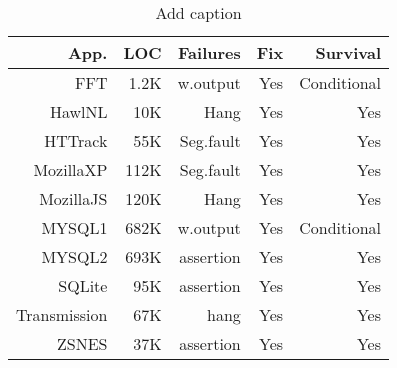 \begin{table}[htbp]
  \centering
  \caption{Add caption}
    \begin{tabular}{rrrrr}
    \toprule
    App. & LOC & Failures & Fix & Survival \\
    \midrule
    FFT & 1.2K & w.output & Yes & Conditional \\
    HawlNL & 10K & Hang & Yes & Yes \\
    HTTrack & 55K & Seg.fault & Yes & Yes \\
    MozillaXP & 112K & Seg.fault & Yes & Yes \\
    MozillaJS & 120K & Hang & Yes & Yes \\
    MYSQL1 & 682K & w.output & Yes & Conditional \\
    MYSQL2 & 693K & assertion & Yes & Yes \\
    SQLite & 95K & assertion & Yes & Yes \\
    Transmission & 67K & hang & Yes & Yes \\
    ZSNES & 37K & assertion & Yes & Yes \\
    \bottomrule
    \end{tabular}%
  \label{tab:addlabel}%
\end{table}%
